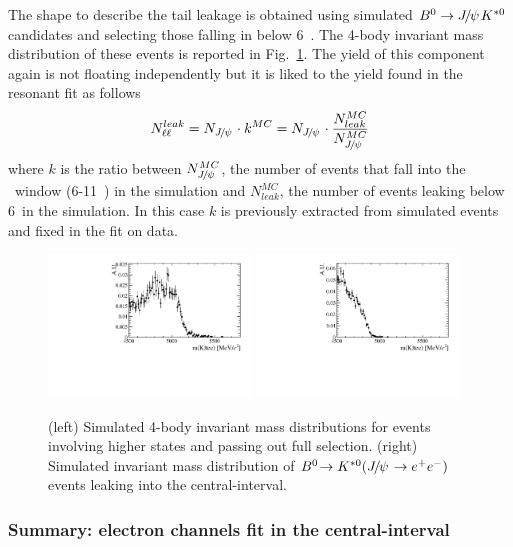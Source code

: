 The shape to describe the \jpsi tail leakage is obtained using simulated $\Bz\to\jpsi\Kstarz$ candidates
and selecting those falling in \qsq below 6~\gevgevcccc. The 4-body invariant mass distribution
of these events is reported in Fig.~\ref{fig:RKst_rare_misreco_distrib}. The yield of this component
again is not floating independently but it is liked to the yield found in the resonant fit as follows
\begin{equation}
N_{\ell\ell}^{leak} = N_{\jpsi} \cdot k^{MC} = N_{\jpsi} \cdot \frac{N_{leak}^{MC}}{N_{\jpsi}^{MC}}
\end{equation}
where $k$ is the ratio between $N_{\jpsi}^{MC}$, the number of \jpsi events
that fall into the \jpsi ~\qsq window (6-11~\gevgevcccc) in the simulation
and $N_{leak}^{MC}$, the number of \jpsi events leaking below 6~\gevgevcccc in the simulation.
In this case $k$ is previously extracted from simulated events and fixed in the fit on data.

\begin{figure}[h!]
\centering
\includegraphics[width=0.48\textwidth]{RKst/figs/misreco/part_had.pdf}
\includegraphics[width=0.48\textwidth]{RKst/figs/misreco/jpsi_leakage.pdf}
\caption{(left) Simulated 4-body invariant mass distributions for events involving
higher \Kstar states and passing out full selection. (right) Simulated invariant mass
distribution of $\decay{\Bz}{\Kstarz(\jpsi\to\ee)}$ events leaking into the central-\qsq interval.}
\label{fig:RKst_rare_misreco_distrib}
\end{figure}


\subsubsection{Summary: electron channels fit in the central-\qsq interval}

